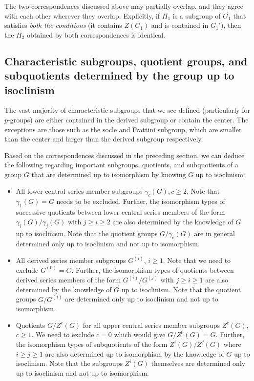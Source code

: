 \documentclass{ucetd}
\begin{document}
The two correspondences discussed above may partially overlap, and
they agree with each other wherever they overlap. Explicitly, if $H_1$
is a subgroup of $G_1$ that satisfies {\em both the conditions} (it
contains $Z(G_1)$ and is contained in $G_1'$), then the $H_2$ obtained
by both correspondences is identical.

\subsection{Characteristic subgroups, quotient groups, and subquotients determined by the group up to isoclinism}\label{sec:isoclinism-char-sub-quot}

The vast majority of characteristic subgroups that we see defined
(particularly for $p$-groups) are either contained in the derived
subgroup or contain the center. The exceptions are those such as the
socle and Frattini subgroup, which are smaller than the center and
larger than the derived subgroup respectively.

Based on the correspondences discussed in the preceding section, we
can deduce the following regarding important subgroups, quotients, and
subquotients of a group $G$ that are determined up to isomorphism by
knowing $G$ up to isoclinism:

\begin{itemize}
\item All lower central series member subgroups $\gamma_c(G), c \ge
  2$. Note that $\gamma_1(G) = G$ needs to be excluded. Further, the
  isomorphism types of successive quotients between lower central
  series members of the form $\gamma_i(G)/\gamma_j(G)$ with $j \ge i
  \ge 2$ are also determined by the knowledge of $G$ up to
  isoclinism. Note that the quotient groups $G/\gamma_c(G)$ are in
  general determined only up to isoclinism and not up to isomorphism.

\item All derived series member subgroups $G^{(i)}$, $i \ge 1$. Note
  that we need to exclude $G^{(0)} = G$. Further, the isomorphism
  types of quotients between derived series members of the form
  $G^{(i)}/G^{(j)}$ with $j \ge i \ge 1$ are also determined by the
  knowledge of $G$ up to isoclinism. Note that the quotient groups
  $G/G^{(i)}$ are determined only up to isoclinism and not up to
  isomorphism.
\item Quotients $G/Z^c(G)$ for all upper central series member
  subgroups $Z^c(G)$, $c \ge 1$. We need to exclude $c = 0$ which
  would give $G/Z^0(G) = G$. Further, the isomorphism types of
  subquotients of the form $Z^i(G)/Z^j(G)$ where $i \ge j \ge 1$ are
  also determined up to isomorphism by the knowledge of $G$ up to
  isoclinism. Note that the subgroups $Z^i(G)$ themselves are
  determined only up to isoclinism and not up to isomorphism.
\end{itemize}
\end{document}
